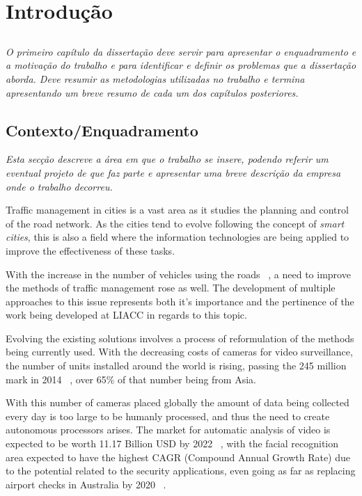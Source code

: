 
\chapter{Introdução} \label{chap:intro}

\section*{}

\textit{O primeiro capítulo da dissertação deve servir para apresentar o
enquadramento e a moti\-va\-ção do trabalho e para identificar e
definir os problemas que a dissertação aborda.
Deve resumir as metodologias utilizadas no trabalho e termina
apresentando um breve resumo de cada um dos capítulos
posteriores.}

\section{Contexto/Enquadramento} \label{sec:context}
\textit{
Esta secção descreve a área em que o trabalho se insere, podendo
referir um eventual projeto de que faz parte e apresentar uma breve
descrição da empresa onde o trabalho decorreu.
}

Traffic management in cities is a vast area as it studies the planning and control of the road network. As the cities tend to evolve following the concept of \textit{smart cities}, this is also a field where the information technologies are being applied to improve the effectiveness of these tasks.

With the increase in the number of vehicles using the roads ~\cite{navigant_transportation_2017}, a need to improve the methods of traffic management rose as well. The development of multiple approaches to this issue represents both it's importance and the pertinence of the work being developed at LIACC in regards to this topic.

Evolving the existing solutions involves a process of reformulation of the methods being currently used. With the decreasing costs of cameras for video surveillance, the number of units installed around the world is rising, passing the 245 million mark in 2014 ~\cite{jenkins_245_2015}, over 65\% of that number being from Asia.

With this number of cameras placed globally the amount of data being collected every day is too large to be humanly processed, and thus the need to create autonomous processors arises. The market for automatic analysis of video is expected to be worth 11.17 Billion USD by 2022 ~\cite{reportlinker_global_2017}, with the facial recognition area expected to have the highest CAGR (Compound Annual Growth Rate) due to the potential related to the security applications, even going as far as replacing airport checks in Australia by 2020 ~\cite{koziol_world_2017}.

